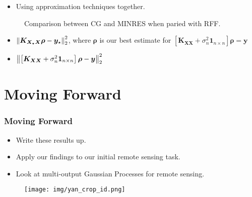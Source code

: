 \documentclass[9pt,hyperref={pdfpagelabels=false},xcolor=table]{beamer}
\begin{document}
\begin{frame}
    \begin{itemize}
        \item Using approximation techniques together.
    \end{itemize}
    \begin{figure}
        \centering
        \caption{Comparison between CG and MINRES when paried with RFF.}
    \end{figure}
\end{frame}

\begin{frame}
    \begin{itemize}
        \item $\left\lVert\bm{K_{X_{\star} X}} \bm{\rho} - \bm{y}_{\star}\right\rVert_2^2$, where $\bm{\rho}$ is our best estimate for $\left[ \bm{K_{XX}} + \sigma_n^2 \bm{1}_{n \times n} \right] \bm{\rho} = \bm{y}$
              \bigskip
              \bigskip
              \pause
        \item $\left\lVert\left[ \bm{K_{XX}} + \sigma_n^2 \bm{1}_{n \times n} \right] \bm{\rho} - \bm{y}\right\rVert_2^2$
    \end{itemize}
\end{frame}

\section{Moving Forward}

\begin{frame}
    \frametitle{Moving Forward}
    \begin{itemize}
        \item Write these results up.
              \bigskip
        \item Apply our findings to our initial remote sensing task.
              \bigskip
        \item Look at multi-output Gaussian Processes for remote sensing.
    \end{itemize}
\end{frame}

\begin{frame}
    \begin{figure}
        \centering
        \texttt{[image: img/yan\_crop\_id.png]}
    \end{figure}
\end{frame}
\end{document}
